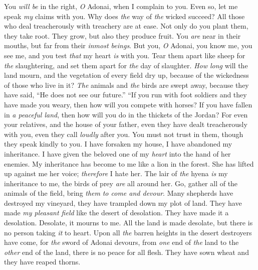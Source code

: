 \begin{biblechapter} %
 You \textit{will be} in the right, \textit{O} Adonai, when I complain to you. 
Even so, let me speak \textit{my} claims with you. 
Why does \textit{the} way of \textit{the} wicked succeed? 
All those who deal treacherously with treachery are at ease.
\verse Not only do you plant them, they take root. 
They grow, but also they produce fruit. 
You \textit{are} near in their mouths, 
but far from their \textit{inmost beings}.
\verse But you, \textit{O} Adonai, you know me, 
you see me, and you test \textit{that} my heart \textit{is} with you. 
Tear them apart like sheep for \textit{the} slaughtering, 
and set them apart for \textit{the} day of slaughter.
\verse \textit{How long} will the land mourn, and the vegetation of every field dry up, 
because of the wickedness of those who live in it? 
\textit{The} animals and \textit{the} birds are swept away, 
because they have said, “He does not see our future.”
 “If you run with foot soldiers and they have made you weary, 
then how will you compete with horses? 
If you have fallen in \textit{a peaceful land}, 
then how will you do in the thickets of the Jordan?
\verse For even your relatives, and the house of your father, 
even they have dealt treacherously with you, 
even they call \textit{loudly} after you. 
You must not trust in them, though they speak kindly to you.
\verse I have forsaken my house, I have abandoned my inheritance. 
I have given the beloved one of my \textit{heart} into the hand of her enemies.
\verse My inheritance has become to me like a lion in the forest. 
She has lifted up against me her voice; \textit{therefore} I hate her.
\verse The lair of \textit{the} hyena \textit{is} my inheritance to me, 
the birds of prey \textit{are} all around her. 
Go, gather all of the animals of the field, 
bring \textit{them} \textit{to come and devour}.
\verse Many shepherds have destroyed my vineyard, 
they have trampled down my plot of land. 
They have made \textit{my pleasant field} 
like the desert of desolation.
\verse They have made it a desolation. 
Desolate, it mourns to me. 
All the land is made desolate, 
but there is no person taking \textit{it} to heart.
\verse Upon all \textit{the} barren heights in the desert destroyers have come, 
for \textit{the} sword of Adonai devours, 
from \textit{one} end of \textit{the} land to the \textit{other} end of the land, 
there is no peace for all flesh.
\verse They have sown wheat and they have reaped thorns. 

\end{biblechapter}
